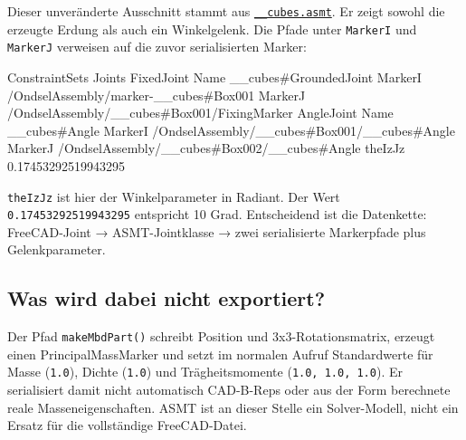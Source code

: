 \documentclass[
  12pt
]{book}
\newenvironment{Shaded}{}{}
\newcommand{\NormalTok}[1]{#1}
\begin{document}
Dieser unveränderte Ausschnitt stammt aus
\href{./examples/07-ondselsolver-real-asmt/__cubes.asmt}{\texttt{\_\_cubes.asmt}}.
Er zeigt sowohl die erzeugte Erdung als auch ein Winkelgelenk. Die Pfade
unter \texttt{MarkerI} und \texttt{MarkerJ} verweisen auf die zuvor
serialisierten Marker:

\begin{Shaded}
\begin{Highlighting}[]
\NormalTok{    ConstraintSets}
\NormalTok{        Joints}
\NormalTok{            FixedJoint}
\NormalTok{                Name}
\NormalTok{                    \_\_cubes\#GroundedJoint}
\NormalTok{                MarkerI}
\NormalTok{                    /OndselAssembly/marker{-}\_\_cubes\#Box001}
\NormalTok{                MarkerJ}
\NormalTok{                    /OndselAssembly/\_\_cubes\#Box001/FixingMarker}
\NormalTok{            AngleJoint}
\NormalTok{                Name}
\NormalTok{                    \_\_cubes\#Angle}
\NormalTok{                MarkerI}
\NormalTok{                    /OndselAssembly/\_\_cubes\#Box001/\_\_cubes\#Angle}
\NormalTok{                MarkerJ}
\NormalTok{                    /OndselAssembly/\_\_cubes\#Box002/\_\_cubes\#Angle}
\NormalTok{                theIzJz}
\NormalTok{                    0.17453292519943295}
\end{Highlighting}
\end{Shaded}

\texttt{theIzJz} ist hier der Winkelparameter in Radiant. Der Wert
\texttt{0.17453292519943295} entspricht 10 Grad. Entscheidend ist die
Datenkette: FreeCAD-Joint → ASMT-Jointklasse → zwei serialisierte
Markerpfade plus Gelenkparameter.

\hypertarget{was-wird-dabei-nicht-exportiert}{%
\subsection*{Was wird dabei nicht
exportiert?}\label{was-wird-dabei-nicht-exportiert}}

Der Pfad \texttt{makeMbdPart()} schreibt Position und
3x3-Rotationsmatrix, erzeugt einen PrincipalMassMarker und setzt im
normalen Aufruf Standardwerte für Masse (\texttt{1.0}), Dichte
(\texttt{1.0}) und Trägheitsmomente (\texttt{1.0,\ 1.0,\ 1.0}). Er
serialisiert damit nicht automatisch CAD-B-Reps oder aus der Form
berechnete reale Masseneigenschaften. ASMT ist an dieser Stelle ein
Solver-Modell, nicht ein Ersatz für die vollständige FreeCAD-Datei.
\end{document}
